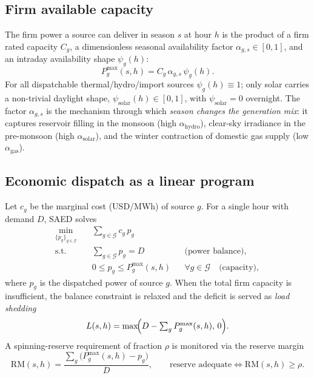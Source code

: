 \documentclass[11pt]{article}
\newcommand{\Pmax}{P^{\mathrm{max}}}
\newcommand{\srcset}{\mathcal{G}}
\begin{document}
\subsection{Firm available capacity}
The firm power a source can deliver in season $s$ at hour $h$ is the product of
a firm rated capacity $C_g$, a dimensionless seasonal availability factor
$\alpha_{g,s}\in[0,1]$, and an intraday availability shape $\psi_g(h)$:
\begin{equation}
\Pmax_{g}(s,h)=C_g\,\alpha_{g,s}\,\psi_g(h).
\label{eq:pmax}
\end{equation}
For all dispatchable thermal/hydro/import sources $\psi_g(h)\equiv1$; only
solar carries a non-trivial daylight shape, $\psi_{\text{solar}}(h)\in[0,1]$,
with $\psi_{\text{solar}}=0$ overnight. The factor $\alpha_{g,s}$ is the
mechanism through which \emph{season changes the generation mix}: it captures
reservoir filling in the monsoon (high $\alpha_{\text{hydro}}$), clear-sky
irradiance in the pre-monsoon (high $\alpha_{\text{solar}}$), and the winter
contraction of domestic gas supply (low $\alpha_{\text{gas}}$).

\subsection{Economic dispatch as a linear program}
Let $c_g$ be the marginal cost (\si{USD/MWh}) of source $g$. For a single hour
with demand $D$, SAED solves
\begin{equation}
\begin{aligned}
\min_{\{p_g\}_{g\in\srcset}}\quad & \sum_{g\in\srcset} c_g\,p_g \\
\text{s.t.}\quad
& \sum_{g\in\srcset} p_g = D && \text{(power balance)},\\
& 0\le p_g \le \Pmax_g(s,h) && \forall g\in\srcset \quad\text{(capacity)},
\end{aligned}
\label{eq:lp}
\end{equation}
where $p_g$ is the dispatched power of source $g$. When the total firm capacity
is insufficient, the balance constraint is relaxed and the deficit is served as
\emph{load shedding}
\begin{equation}
L(s,h)=\max\!\Bigl(D-\textstyle\sum_{g}\Pmax_g(s,h),\,0\Bigr).
\label{eq:shed}
\end{equation}
A spinning-reserve requirement of fraction $\rho$ is monitored via the reserve
margin
\begin{equation}
\mathrm{RM}(s,h)=\frac{\sum_{g}\bigl(\Pmax_g(s,h)-p_g\bigr)}{D},
\qquad \text{reserve adequate} \iff \mathrm{RM}(s,h)\ge\rho.
\label{eq:reserve}
\end{equation}
\end{document}
